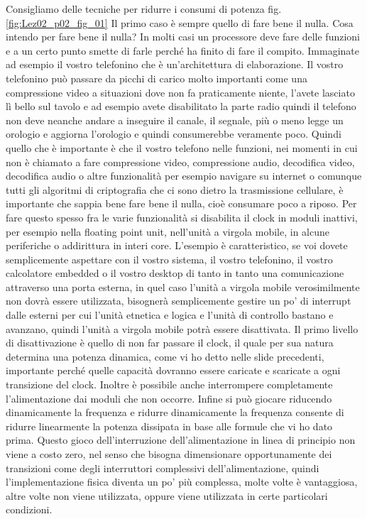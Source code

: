 Consigliamo delle tecniche per ridurre i consumi di potenza fig. \ref{fig:Lez02_p02_fig_01}
Il primo caso è sempre quello di fare bene il nulla.
Cosa intendo per fare bene il nulla?
In molti casi un processore deve fare delle funzioni e a un certo punto smette di farle perché ha finito di fare il compito.
Immaginate ad esempio il vostro telefonino che è un'architettura di elaborazione.
Il vostro telefonino può passare da picchi di carico molto importanti come una compressione video a situazioni dove non fa praticamente niente, l'avete lasciato lì bello sul tavolo e ad esempio avete disabilitato la parte radio quindi il telefono non deve neanche andare a inseguire il canale, il segnale, più o meno legge un orologio e aggiorna l'orologio e quindi consumerebbe veramente poco.
Quindi quello che è importante è che il vostro telefono nelle funzioni, nei momenti in cui non è chiamato a fare compressione video, compressione audio, decodifica video, decodifica audio o altre funzionalità per esempio navigare su internet o comunque tutti gli algoritmi di criptografia che ci sono dietro la trasmissione cellulare, è importante che sappia bene fare bene il nulla, cioè consumare poco a riposo.
Per fare questo spesso fra le varie funzionalità si disabilita il clock in moduli inattivi, per esempio nella floating point unit, nell'unità a virgola mobile, in alcune periferiche o addirittura in interi core.
L'esempio è caratteristico, se voi dovete semplicemente aspettare con il vostro sistema, il vostro telefonino, il vostro calcolatore embedded o il vostro desktop di tanto in tanto una comunicazione attraverso una porta esterna, in quel caso l'unità a virgola mobile verosimilmente non dovrà essere utilizzata, bisognerà semplicemente gestire un po' di interrupt dalle esterni per cui l'unità etnetica e logica e l'unità di controllo bastano e avanzano, quindi l'unità a virgola mobile potrà essere disattivata.
Il primo livello di disattivazione è quello di non far passare il clock, il quale per sua natura determina una potenza dinamica, come vi ho detto nelle slide precedenti, importante perché quelle capacità dovranno essere caricate e scaricate a ogni transizione del clock.
Inoltre è possibile anche interrompere completamente l'alimentazione dai moduli che non occorre.
Infine si può giocare riducendo dinamicamente la frequenza e ridurre dinamicamente la frequenza consente di ridurre linearmente la potenza dissipata in base alle formule che vi ho dato prima.
Questo gioco dell'interruzione dell'alimentazione in linea di principio non viene a costo zero, nel senso che bisogna dimensionare opportunamente dei transizioni come degli interruttori complessivi dell'alimentazione, quindi l'implementazione fisica diventa un po' più complessa, molte volte è vantaggiosa, altre volte non viene utilizzata, oppure viene utilizzata in certe particolari condizioni.
